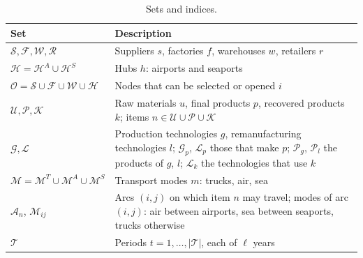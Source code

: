 \documentclass[review,11pt,nonatbib]{elsarticle}
\theoremstyle{remark}
\begin{document}
\begin{table}[!htbp]
\centering
\caption{Sets and indices.}\label{tab:sets}
\footnotesize
\begin{tabularx}{\textwidth}{@{}lL@{}}
\toprule
Set & Description \\
\midrule
$\mathcal{S}, \mathcal{F}, \mathcal{W}, \mathcal{R}$ & Suppliers $s$, factories $f$, warehouses $w$, retailers $r$ \\
$\mathcal{H} = \mathcal{H}^A \cup \mathcal{H}^S$ & Hubs $h$: airports and seaports \\
$\mathcal{O} = \mathcal{S} \cup \mathcal{F} \cup \mathcal{W} \cup \mathcal{H}$ & Nodes that can be selected or opened $i$ \\
$\mathcal{U}, \mathcal{P}, \mathcal{K}$ & Raw materials $u$, final products $p$, recovered products $k$; items $n \in \mathcal{U} \cup \mathcal{P} \cup \mathcal{K}$ \\
$\mathcal{G}, \mathcal{L}$ & Production technologies $g$, remanufacturing technologies $l$; $\mathcal{G}_p$, $\mathcal{L}_p$ those that make $p$; $\mathcal{P}_g$, $\mathcal{P}_l$ the products of $g$, $l$; $\mathcal{L}_k$ the technologies that use $k$ \\
$\mathcal{M} = \mathcal{M}^T \cup \mathcal{M}^A \cup \mathcal{M}^S$ & Transport modes $m$: trucks, air, sea \\
$\mathcal{A}_n$, $\mathcal{M}_{ij}$ & Arcs $(i,j)$ on which item $n$ may travel; modes of arc $(i,j)$: air between airports, sea between seaports, trucks otherwise \\
$\mathcal{T}$ & Periods $t = 1, \dots, |\mathcal{T}|$, each of $\ell$ years \\
\bottomrule
\end{tabularx}
\end{table}
\end{document}
